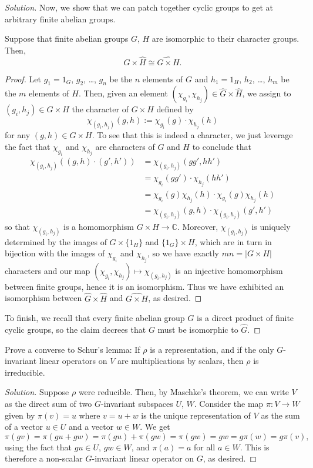 \documentclass[10pt]{scrartcl}
\providecommand{\CC}{\mathbb C}
\newenvironment{soln}{\begin{proof}[Solution]}{\end{proof}}
\begin{document}
\begin{soln}
	Now, we show that we can patch together cyclic groups
	to get at arbitrary finite abelian groups.
	\begin{claim*}
		Suppose that finite abelian groups $G$, $H$ are
		isomorphic to their character groups. Then,
		\[\widehat G\times\widehat H\cong \widehat{G\times H}.\]
	\end{claim*}
	\begin{proof}
		Let $g_1 = 1_G$, $g_2$, \dots, $g_n$ be the $n$ elements of $G$
		and $h_1 = 1_H$, $h_2$, \dots, $h_m$ be the $m$ elements of $H$.
		Then, given an element $(\chi_{g_i}, \chi_{h_j})\in
		\widehat G\times\widehat H$, we assign to $(g_i,h_j)\in G\times H$
		the character of $G\times H$ defined by
		\[\chi_{(g_i,h_j)}(g,h) := \chi_{g_i}(g)\cdot \chi_{h_j}(h)\]
		for any $(g,h)\in G\times H$.
		To see that this is indeed a character, we
		just leverage the fact that $\chi_{g_i}$ and $\chi_{h_j}$
		are characters of $G$ and $H$ to conclude that
		\begin{align*}
			\chi_{(g_i,h_j)}((g,h)\cdot(g',h'))
			&=\chi_{(g_i,h_j)}(gg',hh')\\
			&= \chi_{g_i}(gg')\cdot\chi_{h_j}(hh')\\
			&= \chi_{g_i}(g)\chi_{h_j}(h)\cdot\chi_{g_i}(g)\chi_{h_j}(h)\\
			&= \chi_{(g_i,h_j)}(g,h)\cdot\chi_{(g_i,h_j)}(g',h')
		\end{align*}
		so that $\chi_{(g_i,h_j)}$ is a homomorphism $G\times H\to\CC$.
		Moreover, $\chi_{(g_i,h_j)}$ is uniquely determined by
		the images of $G\times\{1_H\}$ and $\{1_G\}\times H$,
		which are in turn in bijection with the images of
		$\chi_{g_i}$ and $\chi_{h_j}$, so we have
		exactly $mn = |G\times H|$ characters
		and our map $(\chi_{g_i}, \chi_{h_j})\mapsto\chi_{(g_i,h_j)}$
		is an injective homomorphism between finite groups,
		hence it is an isomorphism.
		Thus we have exhibited an isomorphism between
		$\widehat G\times\widehat H$ and $\widehat{G\times H}$, as desired.
	\end{proof}
	
	To finish, we recall that every finite abelian group $G$
	is a direct product of finite cyclic groups,
	so the claim decrees that $G$ must be isomorphic to $\widehat G$.
\end{soln}
\pagebreak
\begin{problem*}[7.1]
	Prove a converse to Schur's lemma: If $\rho$ is a representation,
	and if the only $G$-invariant linear operators on $V$
	are multiplications by scalars, then $\rho$ is irreducible.
\end{problem*}

\begin{soln}
	Suppose $\rho$ were reducible. Then, by Maschke's theorem,
	we can write $V$ as the direct sum of two $G$-invariant subspaces
	$U$, $W$. Consider the map $\pi\colon V\to W$ given by
	$\pi(v) = u$ where $v = u + w$ is the unique representation of $V$
	as the sum of a vector $u\in U$ and a vector $w\in W$. We get
	\[\pi(gv) = \pi(gu + gw) = \pi(gu) + \pi(gw) = \pi(gw)
	= gw = g\pi(w) = g\pi(v),\]
	using the fact that $gu\in U$, $gw\in W$, and $\pi(a) = a$ for all $a\in W$.
	This is therefore a non-scalar $G$-invariant linear operator on $G$,
	as desired.
\end{soln}
\end{document}
